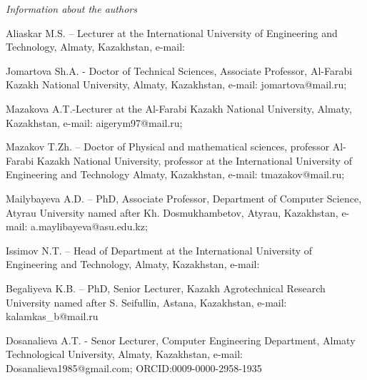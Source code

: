 \begin{authorinfo}
\emph{Information about the authors}

Aliaskar M.S. -- Lecturer at the International University of Engineering
and Technology, Almaty, Kazakhstan, e-mail:


Jomartova Sh.A. - Doctor of Technical Sciences, Associate Professor,
Al-Farabi Kazakh National University, Almaty, Kazakhstan, e-mail:
jomartova@mail.ru;

Mazakova A.T.-Lecturer at the Al-Farabi Kazakh National University,
Almaty, Kazakhstan, e-mail:
aigerym97@mail.ru;

Mazakov T.Zh. -- Doctor of Physical and mathematical sciences, professor
Al-Farabi Kazakh National University, professor at the International
University of Engineering and Technology Almaty, Kazakhstan, e-mail:
tmazakov@mail.ru;

Mailybayeva A.D. -- PhD, Associate Professor, Department of Computer
Science, Atyrau University named after Kh. Dosmukhambetov, Atyrau,
Kazakhstan, e-mail:
a.maylibayeva@asu.edu.kz;

Issimov N.T. -- Head of Department at the International University of
Engineering and Technology, Almaty, Kazakhstan, e-mail:


Begaliyeva K.B. -- PhD, Senior Lecturer, Kazakh Agrotechnical Research
University named after S. Seifullin, Astana, Kazakhstan, e-mail:
kalamkas\_b@mail.ru

Dosanalieva A.T. - Senor Lecturer, Computer Engineering Department,
Almaty Technological University, Almaty, Kazakhstan, e-mail:
Dosanalieva1985@gmail.com;
ORCID:0009-0000-2958-1935\
\end{authorinfo}
